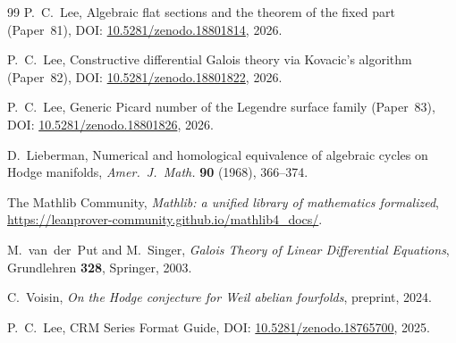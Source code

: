 \documentclass[11pt]{article}
\theoremstyle{plain}
\theoremstyle{definition}
\theoremstyle{remark}
\begin{document}
\begin{thebibliography}{99}
P.~C.~Lee,
Algebraic flat sections and the theorem of the fixed part (Paper~81),
DOI: \href{https://doi.org/10.5281/zenodo.18801814}{10.5281/zenodo.18801814}, 2026.

P.~C.~Lee,
Constructive differential Galois theory via Kovacic's algorithm (Paper~82),
DOI: \href{https://doi.org/10.5281/zenodo.18801822}{10.5281/zenodo.18801822}, 2026.

P.~C.~Lee,
Generic Picard number of the Legendre surface family (Paper~83),
DOI: \href{https://doi.org/10.5281/zenodo.18801826}{10.5281/zenodo.18801826}, 2026.

D.~Lieberman,
Numerical and homological equivalence of algebraic cycles on Hodge manifolds,
\emph{Amer.\ J.\ Math.} \textbf{90} (1968), 366--374.

The Mathlib Community,
\emph{Mathlib: a unified library of mathematics formalized},
\url{https://leanprover-community.github.io/mathlib4_docs/}.

M.~van~der~Put and M.~Singer,
\emph{Galois Theory of Linear Differential Equations},
Grundlehren \textbf{328}, Springer, 2003.

C.~Voisin,
\emph{On the Hodge conjecture for Weil abelian fourfolds},
preprint, 2024.

P.~C.~Lee,
CRM Series Format Guide,
DOI: \href{https://doi.org/10.5281/zenodo.18765700}{10.5281/zenodo.18765700}, 2025.

\end{thebibliography}
\end{document}
